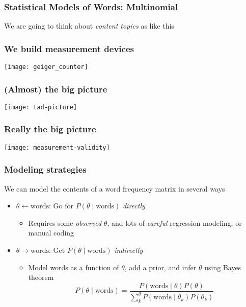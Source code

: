 \documentclass[11pt,compress,professionalfonts]{beamer}
\newcommand{\ita}{\begin{itemize}}
\newcommand{\itm}{\item[]}
\newcommand{\itz}{\end{itemize}}
\begin{document}
\begin{frame}[t,fragile]\frametitle{Statistical Models of Words: Multinomial}

We are going to think about \textit{content topics} as like this

\end{frame}
\begin{frame}[t,fragile]\frametitle{We build measurement devices}

\centerline{\texttt{[image: geiger\_counter]}}

\end{frame}
\begin{frame}[t,fragile]\frametitle{(Almost) the big picture}

\centerline{\texttt{[image: tad-picture]}}

\end{frame}
\begin{frame}[t,fragile]\frametitle{Really the big picture}

\centerline{\texttt{[image: measurement-validity]}}

%
%
%
%
%

\end{frame}
\begin{frame}[t,fragile]\frametitle{Modeling strategies}

We can model the contents of a word frequency matrix in several ways
\ita
\itm $\theta \longleftarrow \text{words}$: Go for $P(\theta \mid \text{words})$ \textit{directly}
\ita
\itm Requires some \textit{observed} $\theta$, and lots of \textit{careful} regression modeling, or manual coding
\itz
\itm $\theta \longrightarrow \text{words}$: Get $P(\theta \mid \text{words})$ \textit{indirectly}
\ita
\itm Model words as a function of $\theta$, add a prior, and infer $\theta$ using Bayes theorem
\[
P(\theta \mid \text{words}) = \frac{P(\text{words} \mid \theta)P(\theta)}{\sum^\theta_k P(\text{words} \mid \theta_k)P(\theta_k)}
\]
\itz
\itz


\end{frame}
\end{document}
